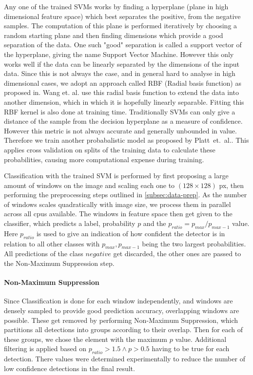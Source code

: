 \documentclass[11pt]{article}
\begin{document}
Any one of the trained SVMs works by finding a hyperplane (plane in high dimensional feature space) which best separates the positive, from the negative samples.
The computation of this plane is performed iteratively by choosing a random starting plane and then finding dimensions which provide a good separation of the data.
One such "good" separation is called a support vector of the hyperplane, giving the name Support Vector Machine.
However this only works well if the data can be linearly separated by the dimensions of the input data.
Since this is not always the case, and in general hard to analyse in high dimensional cases, we adopt an approach called RBF (Radial basis function) as proposed in\cite{10.1007/978-3-540-28647-9_85}.
Wang et. al. use this radial basis function to extend the data into another dimension, which in which it is hopefully linearly separable. Fitting this RBF kernel is also done at training time.
Traditionally SVMs can only give a distance of the sample from the decision hyperplane as a measure of confidence.
However this metric is not always accurate and generally unbounded in value. Therefore we train another probabalistic model as proposed by Platt\ et.\ al.\cite{Platt99probabilisticoutputs}.
This applies cross validation on splits of the training data to calculate these probabilities, causing more computational expense during training.

Classification with the trained SVM is performed by first proposing a large amount of windows on the image and scaling each one to
\( (128 \times 128) \) px, then performing the preprocessing steps outlined in \autoref{subsec:data-prep}. As the number of windows scales quadratically
with image size, we process them in parallel across all cpus available. The windows in feature space then get given to the classifier, which predicts a label, probability \( p \) and the
\( p_{ratio} = p_{max} / p_{max - 1} \) value. Here \( p_{ratio} \) is used to give an indication of how confident the detector is in relation to all other classes with \( p_{max}, p_{max-1} \) being the two largest probabilities.
All predictions of the class \( negative \) get discarded, the other ones are passed to the Non-Maximum Suppression step.


\paragraph{Non-Maximum Suppression}
Since Classification is done for each window independently, and windows are densely sampled to provide good prediction accuracy,
overlapping windows are possible. These get removed by performing Non-Maximum Suppression, which partitions all detections into groups according to their overlap.
Then for each of these groups, we chose the element with the maximum \( p \) value. Additional filtering is applied based on \( p_{ratio} > 1.5 \wedge p > 0.5 \) having to be true for each detection.
There values were determined experimentally to reduce the number of low confidence detections in the final result.
\end{document}
